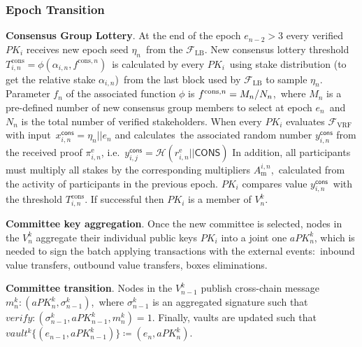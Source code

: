 \subsubsection{Epoch Transition}\label{subsubsec:epoch-transition}
\begin{legal}
    \item \textbf{Consensus Group Lottery}.
    At the end of the epoch ${e_{n-2} \gt 3}$ every verified $PK_i$ receives new epoch seed $\eta_n$\
    from the ${\mathcal{F}}_{\text{LB}}$.
    New consensus lottery threshold $T_{i, n}^{\text{cons}} = \phi(\alpha_{i, n}, f^{\text{cons}, n})$\
    is calculated by every $PK_i$\ using stake distribution (to get the relative stake $\alpha_{i, n}$)\
    from the last block used by ${\mathcal{F}}_{\text{LB}}$ to sample $\eta_n$.
    Parameter $f_n$ of the associated function $\phi$ is ${f^{\text{cons}, n} = M_n /\/ N_n}$,\
    where $M_n$ is a pre-defined number of new consensus group members to select at epoch $e_n$\
    and $N_n$ is the total number of verified stakeholders.
    When every $PK_i$ evaluates ${\mathcal{F}}_{\text{VRF}}$ with input\
    $x_{i, n}^{\textsf{cons}} = \eta_n || e_n $ and calculates\
    the associated random number $y_{i, n}^{\textsf{cons}}$ from the received proof $\pi_{i, n}^{\text{e}}$, i.e.\
    ${y_{i, j}^{\textsf{cons}} = \mathcal{H}(r_{i, n}^{\text{e}}||\textsf{CONS})}$
    In addition, all participants must multiply all stakes by the corresponding multipliers $A^{i, n}_{\text{m}}$,\
    calculated from the activity of participants in the previous epoch.
    $PK_i$ compares value $y_{i, n}^{\textsf{cons}}$\
    with the threshold $T_{i, n}^{\text{cons}}$.
    If successful then $PK_i$ is a member of $V^k_n$.

    \item \textbf{Committee key aggregation}.
    Once the new committee is selected, nodes in the $V^k_n$ aggregate their individual public keys $PK_i$ into
    a joint one $aPK^k_n$, which is needed to sign the batch applying transactions with the external events:\
    inbound value transfers, outbound value transfers, boxes eliminations.

    \item \textbf{Committee transition}.
    Nodes in the $V^k_{n - 1}$ publish cross-chain message ${m^k_n : (aPK^k_n, \sigma^k_{n-1})}$,\
    where $\sigma^k_{n-1}$ is an aggregated signature such that ${verify: (\sigma^k_{n-1}, aPK^k_{n-1}, m^k_n) = 1}$.
    Finally, vaults are updated such that ${vault^k\{(e_{n-1}, aPK^k_{n-1})\} \coloneqq(e_n, aPK^k_n)}$.
\end{legal}

